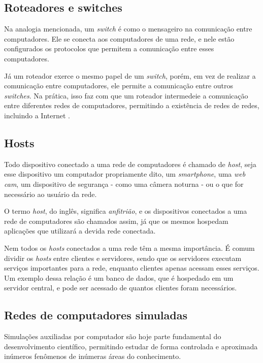 \subsection {Roteadores e switches}

Na analogia mencionada, um \textit{switch} é como o mensageiro na comunicação entre computadores. Ele se conecta aos computadores de uma rede, e nele estão configurados os protocolos que permitem a comunicação entre esses computadores.

Já um roteador exerce o mesmo papel de um \textit{switch}, porém, em vez de realizar a comunicação entre computadores, ele permite a comunicação entre outros \textit{switches}. Na prática, isso faz com que um roteador intermedeie a comunicação entre diferentes redes de computadores, permitindo a existência de redes de redes, incluindo a Internet \cite{router} .

\subsection{Hosts}
Todo dispositivo conectado a uma rede de computadores é chamado de \textit{host}, seja esse dispositivo um computador propriamente dito, um \textit{smartphone}, uma \textit{web cam}, um dispositivo de segurança - como uma câmera noturna - ou o que for necessário ao usuário da rede\cite{kurose}.
	
O termo \textit{host}, do inglês, significa \textit{anfitrião}, e os dispositivos conectados a uma rede de computadores são chamados assim, já que os mesmos hospedam aplicações que utilizará a devida rede conectada.

Nem todos os \textit{hosts} conectados a uma rede têm a mesma importância. É comum dividir os \textit{hosts} entre clientes e servidores, sendo que os servidores executam serviços importantes para a rede, enquanto clientes apenas acessam esses serviços. Um exemplo dessa relação é um banco de dados, que é hospedado em um servidor central, e pode ser acessado de quantos clientes foram necessários.

\subsection{Redes de computadores simuladas}

Simulações auxiliadas por computador são hoje parte fundamental do desenvolvimento científico, permitindo estudar de forma controlada e aproximada inúmeros fenômenos de inúmeras áreas do conhecimento.

